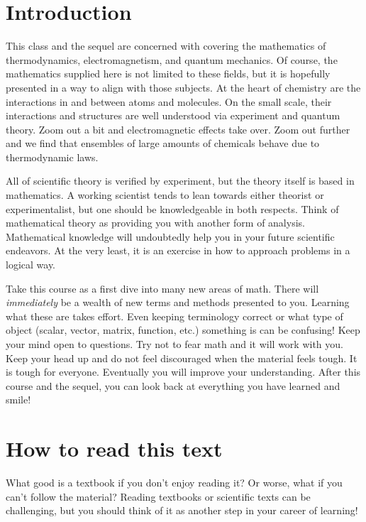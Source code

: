     \section{Introduction}

    This class and the sequel are concerned with covering the mathematics of thermodynamics, electromagnetism, and quantum mechanics. Of course, the mathematics supplied here is not limited to these fields, but it is hopefully presented in a way to align with those subjects.  At the heart of chemistry are the interactions in and between atoms and molecules. On the small scale, their interactions and structures are well understood via experiment and quantum theory. Zoom out a bit and electromagnetic effects take over. Zoom out further and we find that ensembles of large amounts of chemicals behave due to thermodynamic laws.

    All of scientific theory is verified by experiment, but the theory itself is based in mathematics. A working scientist tends to lean towards either theorist or experimentalist, but one should be knowledgeable in both respects.  Think of mathematical theory as providing you with another form of analysis.  Mathematical knowledge will undoubtedly help you in your future scientific endeavors.  At the very least, it is an exercise in how to approach problems in a logical way.

    Take this course as a first dive into many new areas of math.  There will \emph{immediately} be a wealth of new terms and methods presented to you.  Learning what these are takes effort.  Even keeping terminology correct or what type of object (scalar, vector, matrix, function, etc.) something is can be confusing! Keep your mind open to questions.  Try not to fear math and it will work with you. Keep your head up and do not feel discouraged when the material feels tough.  It is tough for everyone.  Eventually you will improve your understanding. After this course and the sequel, you can look back at everything you have learned and smile!


    \section{How to read this text}

    What good is a textbook if you don't enjoy reading it? Or worse, what if you can't follow the material? Reading textbooks or scientific texts can be challenging, but you should think of it as another step in your career of learning!\\

